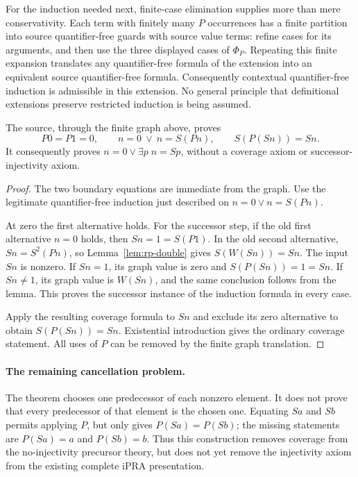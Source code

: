 For the induction needed next, finite-case elimination supplies more than
mere conservativity. Each term with finitely many $P$ occurrences has a
finite partition into source quantifier-free guards with source value
terms: refine cases for its arguments, and then use the three displayed
cases of $\Phi_P$. Repeating this finite expansion translates any
quantifier-free formula of the extension into an equivalent source
quantifier-free formula. Consequently contextual quantifier-free induction
is admissible in this extension. No general principle that definitional
extensions preserve restricted induction is being assumed.

\begin{theorem}
\label{thm:rp-coverage}
The source, through the finite graph above, proves
\[
 P0=P1=0,\qquad
 n=0\ \lor\ n=S(Pn),\qquad
 S(P(Sn))=Sn.
\]
It consequently proves $n=0\lor\exists p\;n=Sp$, without a coverage
axiom or successor-injectivity axiom.
\end{theorem}
\begin{proof}
The two boundary equations are immediate from the graph. Use the
legitimate quantifier-free induction just described on
$n=0\lor n=S(Pn)$.

At zero the first alternative holds. For the successor step, if the old
first alternative $n=0$ holds, then $Sn=1=S(P1)$. In the old second
alternative, $Sn=S^2(Pn)$, so Lemma~\ref{lem:rp-double} gives
$S(W(Sn))=Sn$. The input $Sn$ is nonzero. If $Sn=1$, its graph value
is zero and $S(P(Sn))=1=Sn$. If $Sn\ne1$, its graph value is $W(Sn)$,
and the same conclusion follows from the lemma. This proves the
successor instance of the induction formula in every case.

Apply the resulting coverage formula to $Sn$ and exclude its zero
alternative to obtain $S(P(Sn))=Sn$. Existential introduction gives the
ordinary coverage statement. All uses of $P$ can be removed by the
finite graph translation.
\end{proof}

\paragraph{The remaining cancellation problem.}
The theorem chooses one predecessor of each nonzero element. It does not
prove that every predecessor of that element is the chosen one. Equating
$Sa$ and $Sb$ permits applying $P$, but only gives $P(Sa)=P(Sb)$; the
missing statements are $P(Sa)=a$ and $P(Sb)=b$. Thus this construction
removes coverage from the no-injectivity precursor theory, but does not
yet remove the injectivity axiom from the existing complete iPRA
presentation.

